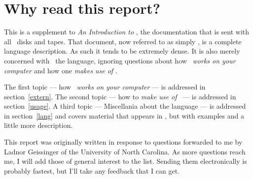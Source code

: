 \section{Why read this report?}
This is a supplement to {\em An Introduction to \ISETL\/},
the documentation that is sent with all \ISETL\ disks and tapes.
That document, now referred to as simply \Intro,
is a complete language description.
As such it tends to be extremely dense.
It is also merely concerned with \ISETL\ the language,
ignoring questions about how \ISETL\ {\em works on your
computer\/} and how one {\em makes use of\/} \ISETL\@.

The first topic --- how \ISETL\ {\em works on your computer\/} ---
is addressed in section~\ref{extern}.
The second topic --- how to {\em make use of\/} \ISETL\ ---
is addressed in section~\ref{usage}.
A third topic --- Miscellania about the language ---
is addressed in section~\ref{lang} and covers material that appears 
in \Intro, but with examples and a little more description.

This report was originally written in response to questions forwarded to me
by  Ladnor Geissinger of the University of North Carolina.
As more questions reach me, I will add those of general interest to the
list.
Sending them electronically is probably fastest, but I'll take
any feedback that I can get.

